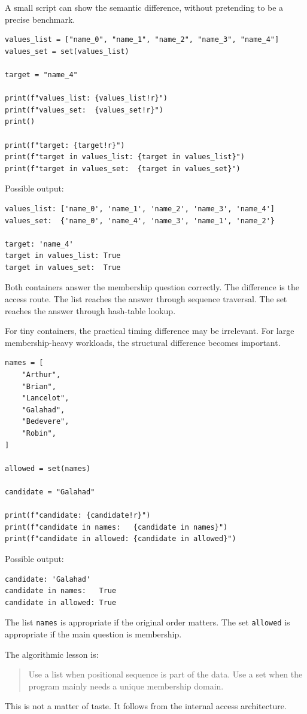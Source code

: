 A small script can show the semantic difference, without pretending to be a precise benchmark.

\begin{verbatim}
values_list = ["name_0", "name_1", "name_2", "name_3", "name_4"]
values_set = set(values_list)

target = "name_4"

print(f"values_list: {values_list!r}")
print(f"values_set:  {values_set!r}")
print()

print(f"target: {target!r}")
print(f"target in values_list: {target in values_list}")
print(f"target in values_set:  {target in values_set}")
\end{verbatim}

Possible output:

\begin{verbatim}
values_list: ['name_0', 'name_1', 'name_2', 'name_3', 'name_4']
values_set:  {'name_0', 'name_4', 'name_3', 'name_1', 'name_2'}

target: 'name_4'
target in values_list: True
target in values_set:  True
\end{verbatim}

Both containers answer the membership question correctly. The difference is the access route. The list reaches the answer through sequence traversal. The set reaches the answer through hash-table lookup.

For tiny containers, the practical timing difference may be irrelevant. For large membership-heavy workloads, the structural difference becomes important.

\begin{verbatim}
names = [
    "Arthur",
    "Brian",
    "Lancelot",
    "Galahad",
    "Bedevere",
    "Robin",
]

allowed = set(names)

candidate = "Galahad"

print(f"candidate: {candidate!r}")
print(f"candidate in names:   {candidate in names}")
print(f"candidate in allowed: {candidate in allowed}")
\end{verbatim}

Possible output:

\begin{verbatim}
candidate: 'Galahad'
candidate in names:   True
candidate in allowed: True
\end{verbatim}

The list \texttt{names} is appropriate if the original order matters. The set \texttt{allowed} is appropriate if the main question is membership.

The algorithmic lesson is:

\begin{quote}
Use a list when positional sequence is part of the data. Use a set when the program mainly needs a unique membership domain.
\end{quote}

This is not a matter of taste. It follows from the internal access architecture.